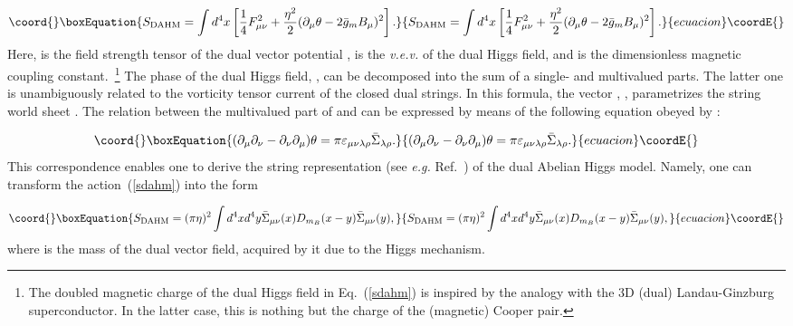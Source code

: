\documentclass[a4paper,12pt]{article}
\begin{document}
\begin{equation}\coord{}\boxEquation{
\label{sdahm}
S_{\rm DAHM}=\int d^4x\left[\frac14F_{\mu\nu}^2+\frac{\eta^2}{2}(\partial_\mu\theta-2\bar g_mB_\mu)^2\right].
}{
S_{\rm DAHM}=\int d^4x\left[\frac14F_{\mu\nu}^2+\frac{\eta^2}{2}(\partial_\mu\theta-2\bar g_mB_\mu)^2\right].
}{ecuacion}\coordE{}\end{equation}
Here, \coordHE{} is the field strength tensor of the dual vector potential \coordHE{}, \myHighlight{$\eta$}\coordHE{} is the 
{\it v.e.v.} of the dual Higgs field, and \coordHE{} is the dimensionless magnetic coupling constant.~\footnote{The doubled 
magnetic charge of the dual Higgs field in Eq.~(\ref{sdahm}) is inspired by the analogy with the 3D (dual) Landau-Ginzburg
superconductor. In the latter case, this is nothing but the charge of the (magnetic) Cooper pair.}  
The phase of the dual Higgs field, \myHighlight{$\theta$}\coordHE{}, can be decomposed into the sum of a single- and multivalued
parts. The latter one is unambiguously related to the vorticity tensor current
\coordHE{} of the 
closed dual strings. In this formula, 
the vector \coordHE{}, \coordHE{}, parametrizes the string world
sheet \myHighlight{$\Sigma$}\coordHE{}. The relation between the multivalued part of \myHighlight{$\theta$}\coordHE{} and \myHighlight{$\bar\Sigma_{\mu\nu}$}\coordHE{} 
can be expressed by means of the following equation obeyed by \myHighlight{$\theta$}\coordHE{}:

\begin{equation}\coord{}\boxEquation{
\label{rel}
(\partial_\mu\partial_\nu-\partial_\nu\partial_\mu)\theta=\pi\varepsilon_{\mu\nu\lambda\rho}
\bar\Sigma_{\lambda\rho}.
}{
(\partial_\mu\partial_\nu-\partial_\nu\partial_\mu)\theta=\pi\varepsilon_{\mu\nu\lambda\rho}
\bar\Sigma_{\lambda\rho}.
}{ecuacion}\coordE{}\end{equation}
This correspondence enables one to derive the string representation 
(see {\it e.g.} Ref.~\cite{orl}) of the dual Abelian Higgs model. Namely, one can transform 
the action~(\ref{sdahm}) into the form 

\begin{equation}\coord{}\boxEquation{
\label{sr}
S_{\rm DAHM}=(\pi\eta)^2\int d^4xd^4y\bar\Sigma_{\mu\nu}(x)D_{m_B}(x-y)\bar\Sigma_{\mu\nu}(y),
}{
S_{\rm DAHM}=(\pi\eta)^2\int d^4xd^4y\bar\Sigma_{\mu\nu}(x)D_{m_B}(x-y)\bar\Sigma_{\mu\nu}(y),
}{ecuacion}\coordE{}\end{equation}
where \coordHE{} is the mass of the dual vector field, acquired by it due to the 
Higgs mechanism. 
\end{document}

